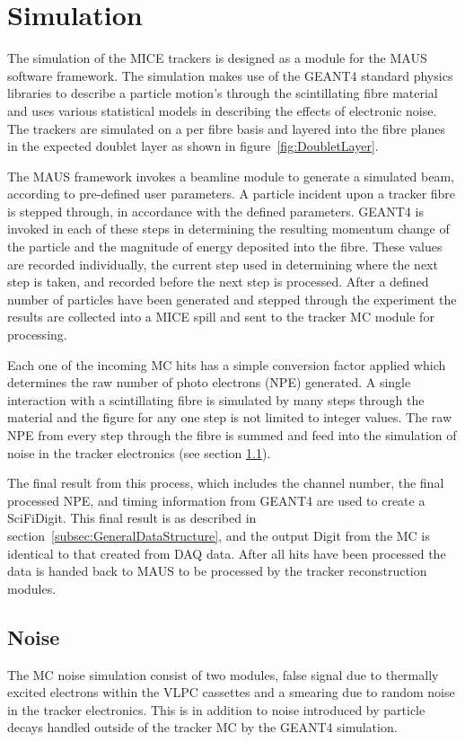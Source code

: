 \section{Simulation}
\label{sec:Simulation}

The simulation of the MICE trackers is designed as a module for the MAUS software framework.  The simulation makes use of the GEANT4 standard physics libraries to describe a particle motion's through the scintillating fibre material and uses various statistical models in describing the effects of electronic noise.  The trackers are simulated on a per fibre basis and layered into the fibre planes in the expected doublet layer as shown in figure~\ref{fig:DoubletLayer}. 

The MAUS framework invokes a beamline module to generate a simulated beam, according to pre-defined user parameters.  A particle incident upon a tracker fibre is stepped through, in accordance with the defined parameters. GEANT4 is invoked in each of these steps in determining the resulting momentum change of the particle and the magnitude of energy  deposited into the fibre.  These values are recorded individually, the current step used in determining where the next step is taken, and recorded before the next step is processed.  After a defined number of particles have been generated and stepped through the experiment the results are collected into a MICE spill and sent to the tracker MC module for processing.  

Each one of the incoming MC hits has a simple conversion factor applied which determines the raw number of photo electrons (NPE) generated.  A single interaction with a scintillating fibre is simulated by many steps through the material and the figure for any one step is not limited to integer values.  The raw NPE from every step through the fibre is summed and feed into the simulation of noise in the tracker electronics (see section \ref{subsec:Noise}).

The final result from this process, which includes the channel number, the final processed NPE, and timing information from GEANT4 are used to create a SciFiDigit.  This final result is as described in section~\ref{subsec:GeneralDataStructure}, and the output Digit from the MC is identical to that created from DAQ data.  After all hits have been processed the data is handed back to MAUS to be processed by the tracker reconstruction modules.

  \subsection{Noise}
  \label{subsec:Noise}
  The MC noise simulation consist of two modules, false signal due to thermally excited electrons within the VLPC cassettes and a smearing due to random noise in the tracker electronics.  This is in addition to noise introduced by particle decays handled outside of the tracker MC by the GEANT4 simulation.
  
